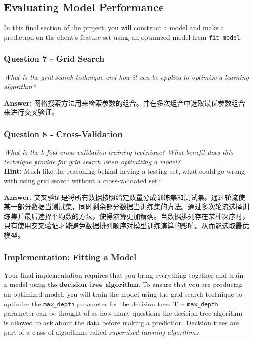 \documentclass{article}
\begin{document}
\subsection{Evaluating Model
Performance}\label{evaluating-model-performance}

In this final section of the project, you will construct a model and
make a prediction on the client's feature set using an optimized model
from \texttt{fit\_model}.

    \subsubsection{Question 7 - Grid Search}\label{question-7---grid-search}

\emph{What is the grid search technique and how it can be applied to
optimize a learning algorithm?}

    \textbf{Answer: }
网格搜索方法用来检索参数的组合。并在多次组合中选取最优参数组合来进行交叉验证。

    \subsubsection{Question 8 -
Cross-Validation}\label{question-8---cross-validation}

\emph{What is the k-fold cross-validation training technique? What
benefit does this technique provide for grid search when optimizing a
model?}\\
\textbf{Hint:} Much like the reasoning behind having a testing set, what
could go wrong with using grid search without a cross-validated set?

    \textbf{Answer: }
交叉验证是将所有数据按照给定数量分成训练集和测试集。通过轮流使某一部分数据当测试集，同时剩余部分数据当训练集的方法。通过多次轮流选择训练集并最后选择平均数的方法，使得演算更加精确。当数据排列存在某种次序时，只有使用交叉验证才能避免数据排列顺序对模型训练演算的影响。从而能选取最优模型。

    \subsubsection{Implementation: Fitting a
Model}\label{implementation-fitting-a-model}

Your final implementation requires that you bring everything together
and train a model using the \textbf{decision tree algorithm}. To ensure
that you are producing an optimized model, you will train the model
using the grid search technique to optimize the
\texttt{\textquotesingle{}max\_depth\textquotesingle{}} parameter for
the decision tree. The
\texttt{\textquotesingle{}max\_depth\textquotesingle{}} parameter can be
thought of as how many questions the decision tree algorithm is allowed
to ask about the data before making a prediction. Decision trees are
part of a class of algorithms called \emph{supervised learning
algorithms}.
\end{document}
